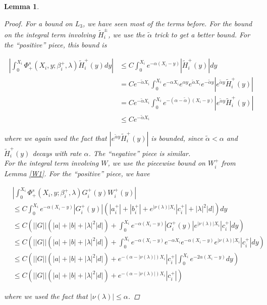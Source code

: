 \documentclass[12pt]{article}
\newtheorem{lemma}{Lemma}
\begin{document}
\begin{lemma}
\begin{proof}
For a bound on $L_3$, we have seen most of the terms before. For the bound on the integral term involving $\tilde{H}_i^\pm$, we use the $\tilde{\alpha}$ trick to get a better bound. For the ``positive'' piece, this bound is

\begin{align*}
\left| \int_0^{X_i} \Phi^s_+(X_i, y; \beta_i^+, \lambda) \tilde{H}_i^+(y) dy \right| 
&\leq C \int_0^{X_i} e^{-\alpha (X_i - y)}|\tilde{H}_i^+(y)| dy \\
&= C e^{-\tilde{\alpha}X_i} \int_0^{X_i} e^{-\alpha X_i} e^{\alpha y}  e^{\tilde{\alpha}X_i} e^{-\tilde{\alpha}y} |e^{\tilde{\alpha}y} \tilde{H}_i^+(y)| \\
&= C e^{-\tilde{\alpha}X_i} \int_0^{X_i} e^{-(\alpha - \tilde{\alpha})(X_i-y)} |e^{\tilde{\alpha}y} \tilde{H}_i^+(y)|\\
&\leq C e^{-\tilde{\alpha}X_i} 
\end{align*}

where we again used the fact that $|e^{\tilde{\alpha}y} \tilde{H}_i^+(y)|$ is bounded, since $\tilde{\alpha} < \alpha$ and $\tilde{H}_i^+(y)$ decays with rate $\alpha$. The ``negative'' piece is similar.\\

For the integral term involving $W$, we use the piecewise bound on $W_i^+$ from Lemma \ref{W1}. For the ``positive'' piece, we have

\begin{align*}
&\left| \int_0^{X_i} \Phi^s_+(X_i, y; \beta_i^+, \lambda) G_i^+(y) W_i^+(y) \right| \\
&\leq C \int_0^{X_i} e^{-\alpha(X_i - y)}|G_i^+(y)|(|a_i^+| + |b_i^+| + e^{|\nu(\lambda)|X_i}|c_i^+| + |\lambda|^2 |d| ) dy \\
&\leq C \left( ||G||(|a| + |b| + |\lambda|^2 |d|) + \int_0^{X_i} e^{-\alpha(X_i - y)}|G_i^+(y)|e^{|\nu(\lambda)|X_i}|c_i^+| dy \right) \\
&\leq C \left( ||G||(|a| + |b| + |\lambda|^2 |d|) + \int_0^{X_i} e^{-\alpha(X_i - y)}e^{-\alpha X_i} e^{-\alpha(X_i - y)} e^{|\nu(\lambda)|X_i}|c_i^+| dy \right)\\
&\leq C \left( ||G||(|a| + |b| + |\lambda|^2 |d|) + e^{-(\alpha - |\nu(\lambda)|)X_i} |c_i^+| \int_0^{X_i} e^{-2\alpha(X_i - y)} dy \right) \\
&\leq C \left( ||G||(|a| + |b| + |\lambda|^2 |d|) + e^{-(\alpha - |\nu(\lambda)|)X_i} |c_i^+| \right)
\end{align*}

where we used the fact that $|\nu(\lambda)| \leq \alpha$.  


\end{proof}
\end{lemma}
\end{document}

